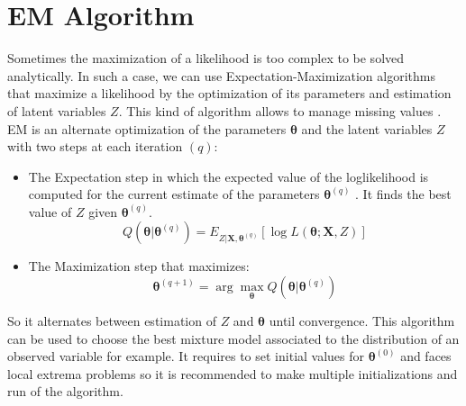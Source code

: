 \documentclass[12pt,a4paper]{report}
\begin{document}
%	
			
%	

	\section{EM Algorithm}
			Sometimes the maximization of a likelihood is too complex to be solved analytically. In such a case, we can use Expectation-Maximization algorithms \cite{mclachlan2007algorithm} that maximize a likelihood by the optimization of its parameters and estimation of latent variables $Z$. This kind of algorithm allows to manage missing values \cite{dempster1977maximum}. \\
			
EM is an alternate optimization of the parameters $\boldsymbol{\theta}$ and the latent variables $Z$ with two steps at each iteration $(q)$:
\begin{itemize}
	\item The Expectation step in which the expected value of the loglikelihood is computed for the current estimate of the parameters $\boldsymbol{\theta}^{(q)}$ . It finds the best value of $Z$ given $\boldsymbol{\theta}^{(q)}$.
	\begin{equation}
		Q(\boldsymbol{\theta}|\boldsymbol{\theta}^{(q)})=E_{Z|\boldsymbol{X},\boldsymbol{\theta}^{(q)}} [\log L(\boldsymbol{\theta};\boldsymbol{X},Z)]
	\end{equation}
	\item The Maximization step that maximizes:
	\begin{equation}
		\boldsymbol{\theta}^{(q+1)}=\arg \max_{\boldsymbol{\theta}} Q(\boldsymbol{\theta}|\boldsymbol{\theta}^{(q)})
	\end{equation}
\end{itemize}
	So it alternates between estimation of $Z$ and $\boldsymbol{\theta}$ until convergence. This algorithm can be used to choose the best mixture model associated to the distribution of an observed variable for example.		
	It requires to set initial values for $\boldsymbol{\theta}^{(0)}$ and faces local extrema problems so it is recommended to make multiple initializations and run of the algorithm.\\
			
\end{document}
